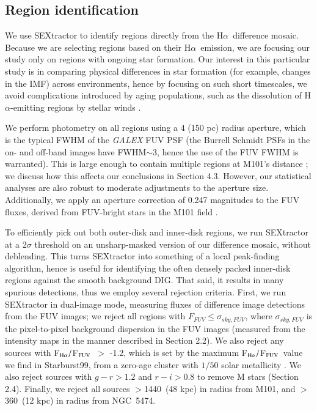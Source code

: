 \documentclass[iop]{emulateapj}
\newcommand{\ha}{H$\alpha$}
\newcommand{\hafuv}{F$_{\rm H\alpha}/$F$_{\rm FUV}$}
\begin{document}
\subsection{Region identification}
We use SEXtractor \citep{bertin96} to identify  regions
directly from the \ha \ difference mosaic.  Because we are selecting
regions based on their \ha \ emission, we are focusing our study only
on regions with ongoing star formation.  Our interest in this
particular study is in comparing physical differences in star
formation (for example, changes in the IMF) across environments, hence
by focusing on such short timescales, we avoid complications
introduced by aging populations, such as the dissolution of
H$\alpha$-emitting regions by stellar winds \citep{whitmore11}.

We perform photometry on all regions using a 4 (150 pc)
  radius aperture, which is the typical FWHM of the \emph{GALEX} FUV
PSF (the Burrell Schmidt PSFs in the on- and off-band images have
FWHM$\sim$3\arcsec, hence the use of the FUV FWHM is warranted).  This
is large enough to contain multiple  regions at M101's
distance \citep[see, for example,][for sizes of Milky Way 
  regions]{quireza06}; we discuss how this affects our conclusions in
Section 4.3.  However, our statistical analyses are also robust to
moderate adjustments to the aperture size.  Additionally, we apply an
  aperture correction of 0.247 magnitudes to the FUV fluxes, derived
  from FUV-bright stars in the M101 field \citep[this agrees well with
    the curve of growth presented by][]{morrissey07}.

To efficiently pick out both outer-disk and inner-disk 
regions, we run SEXtractor at a 2$\sigma$ threshold on an
unsharp-masked version of our difference mosaic, without deblending.
This turns SEXtractor into something of a local peak-finding
algorithm, hence is useful for identifying the often densely packed
inner-disk  regions against the smooth background DIG.  That
said, it results in many spurious detections, thus we employ several
rejection criteria.  First, we run SEXtractor in dual-image mode,
measuring fluxes of difference image detections from the FUV images;
we reject all regions with $F_{FUV} \leq \sigma_{sky,FUV}$, where
$\sigma_{sky,FUV}$ is the pixel-to-pixel background dispersion in the
FUV images (measured from the intensity maps in the manner described
in Section 2.2).  We also reject any sources with \hafuv\ $>$ -1.2,
which is set by the maximum \hafuv \ value we find in Starburst99,
from a zero-age cluster with $1/50$ solar metallicity \citep[lower
  than the lowest metallicity found in M101;][]{croxall16}.  We also
reject sources with $g-r > 1.2$ and $r-i > 0.8$ to remove M stars
(Section 2.4).  Finally, we reject all sources $>$1440\arcsec \ (48
kpc) in radius from M101, and $>$360\arcsec \ (12 kpc) in radius from
NGC~5474.
\end{document}
